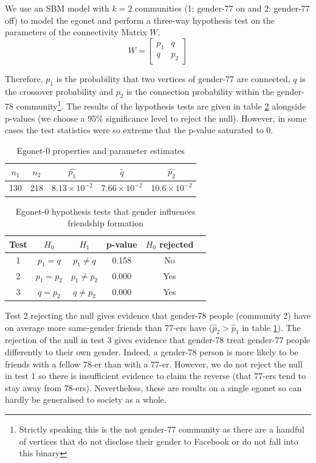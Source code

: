 \documentclass[11pt]{article}
\begin{document}
\begin{multicols*}{2}
We use an SBM model with $k=2$ communities (1: gender-77 on and 2: gender-77 off) to model the egonet and perform a three-way hypothesis test on the parameters of the connectivity Matrix $W$.
%
\begin{equation}
	W = \begin{bmatrix}
		p_1 & q \\
		q & p_2
	\end{bmatrix}
\end{equation}

Therefore, $p_1$ is the probability that two vertices of gender-77 are connected, $q$ is the crossover probability and $p_2$ is the connection probability within the gender-78 community\footnote{Strictly speaking this is the not gender-77 community as there are a handful of vertices that do not disclose their gender to Facebook or do not fall into this binary}. The results of the hypothesis tests are given in table \ref{tab:egonet-0-hyp-tests} alongside p-values (we choose a 95\% significance level to reject the null). However, in some cases the test statistics were so extreme that the p-value saturated to 0.
%
\begin{table}[H]
	\centering
	\begin{tabular}{c c c c c}
		$n_1$                & $n_2$                & $\hat{p_1}$ & $\hat{q}$ & $\hat{p_2}$       \\ \hline
		130 & 218 & $8.13 \times 10^{-2}$ & $7.66 \times 10^{-2}$ & $10.6 \times 10^{-2}$
	\end{tabular}
	\caption{Egonet-0 properties and parameter estimates}
	\label{tab:egonet-0-props}
\end{table}

\begin{table}[H]
	\centering
	\begin{tabular}{cccccc}
		Test & $H_0$                & $H_1$                & p-value & $H_0$ rejected       \\ \hline
		1    & $p_1 = q$            & $p_1 \neq q$         & 0.158 &  No                \\
		2    & $p_1 = p_2$ & $p_1 \neq p_2$ & 0.000 & Yes \\
		3    & $q = p_2$ & $q \neq p_2$ &  0.000 & Yes
	\end{tabular}
	\caption{Egonet-0 hypothesis tests that gender influences friendship formation}
	\label{tab:egonet-0-hyp-tests}
\end{table}

Test 2 rejecting the null gives evidence that gender-78 people (community 2) have on average more same-gender friends than 77-ers have ($\hat{p}_2 > \hat{p}_1$ in table \ref{tab:egonet-0-props}). The rejection of the null in test 3 gives evidence that gender-78 treat gender-77 people differently to their own gender. Indeed, a gender-78 person is more likely to be friends with a fellow 78-er than with a 77-er. However, we do not reject the null in test 1 so there is insufficient evidence to claim the reverse (that 77-ers tend to stay away from 78-ers). Nevertheless, these are results on a single egonet so can hardly be generalised to society as a whole.


\end{multicols*}
\end{document}
